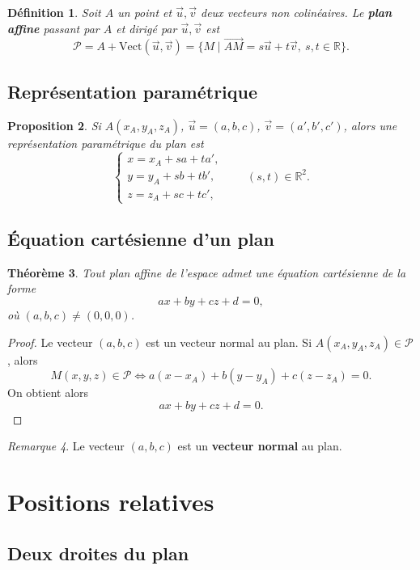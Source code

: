 \documentclass[11pt,a4paper]{article}
\newtheorem{definition}{Définition}[section]
\newtheorem{theoreme}[definition]{Théorème}
\newtheorem{proposition}[definition]{Proposition}
\theoremstyle{remark}
\newtheorem{remarque}[definition]{Remarque}
\newcommand{\R}{\mathbb{R}}
\newcommand{\Vect}{\mathrm{Vect}}
\begin{document}
\begin{definition}
Soit \(A\) un point et \(\vec{u},\vec{v}\) deux vecteurs non colinéaires.  
Le \textbf{plan affine} passant par \(A\) et dirigé par \(\vec{u},\vec{v}\) est
\[
\mathcal P=A+\Vect(\vec{u},\vec{v})
=
\{M\mid \overrightarrow{AM}=s\vec{u}+t\vec{v},\ s,t\in\R\}.
\]
\end{definition}

\subsection{Représentation paramétrique}

\begin{proposition}
Si \(A(x_A,y_A,z_A)\), \(\vec{u}=(a,b,c)\), \(\vec{v}=(a',b',c')\), alors une représentation paramétrique du plan est
\[
\begin{cases}
x=x_A+sa+ta',\\
y=y_A+sb+tb',\\
z=z_A+sc+tc',
\end{cases}
\qquad (s,t)\in\R^2.
\]
\end{proposition}

\subsection{Équation cartésienne d’un plan}

\begin{theoreme}
Tout plan affine de l’espace admet une équation cartésienne de la forme
\[
ax+by+cz+d=0,
\]
où \((a,b,c)\neq (0,0,0)\).
\end{theoreme}

\begin{proof}
Le vecteur \((a,b,c)\) est un vecteur normal au plan.  
Si \(A(x_A,y_A,z_A)\in\mathcal P\), alors
\[
M(x,y,z)\in\mathcal P
\Longleftrightarrow
a(x-x_A)+b(y-y_A)+c(z-z_A)=0.
\]
On obtient alors
\[
ax+by+cz+d=0.
\]
\end{proof}

\begin{remarque}
Le vecteur \((a,b,c)\) est un \textbf{vecteur normal} au plan.
\end{remarque}

\section{Positions relatives}

\subsection{Deux droites du plan}
\end{document}
